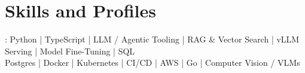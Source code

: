 \documentclass[]{jack-resume}
\begin{document}
\pagecolor{darkmodeBackground}

%
%



%
%
\begin{minipage}[t][1cm][t]{.03\textwidth}
    \hfill
\end{minipage}






\section{Skills and Profiles}
:
Python \hfill | \hfill
TypeScript \hfill | \hfill
LLM / Agentic Tooling \hfill | \hfill
RAG \& Vector Search \hfill | \hfill
vLLM Serving \hfill | \hfill
Model Fine-Tuning \hfill | \hfill
SQL \\
\hspace{1.0cm} Postgres \hfill | \hfill
Docker \hfill | \hfill
Kubernetes \hfill | \hfill
CI/CD \hfill | \hfill
AWS \hfill | \hfill
Go \hfill | \hfill
Computer Vision / VLMs \\
\end{document}
